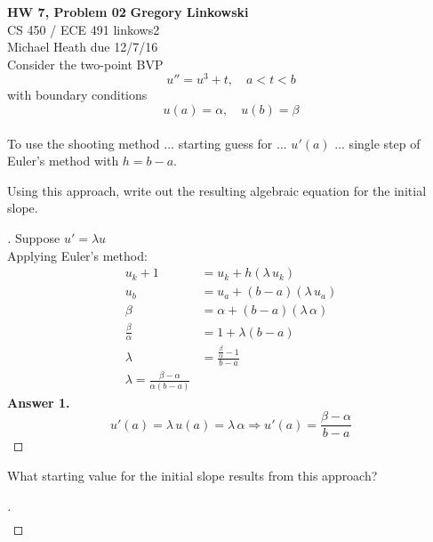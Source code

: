 \documentclass[12pt]{article}
\newenvironment{exercise}[2][Exercise]{\begin{trivlist}
\item[\hskip \labelsep {\bfseries #1}\hskip \labelsep {\bfseries #2.}]}{\end{trivlist}}
\begin{document}
\noindent
\large\textbf{HW 7, Problem 02} \hfill \textbf{Gregory Linkowski} \\
\normalsize CS 450 / ECE 491 \hfill linkows2 \\
Michael Heath \hfill due 12/7/16 \\


\vspace{5mm}
Consider the two-point BVP
\[ u'' = u^3 + t, \quad a < t < b \]
with boundary conditions
\[ u(a) = \alpha, \quad u(b) = \beta \] \\
To use the shooting method ... starting guess for ... $u'(a)$ ... single step of Euler's method with $h = b - a$.
\vspace{-2mm} \\

\vspace{5mm}
\begin{exercise}{1}
	Using this approach, write out the resulting algebraic equation for the initial slope.
\end{exercise} %
\begin{proof}[]
	Suppose $u' = \lambda u$ \\
	Applying Euler's method:
	\begin{align*}
		u_k+1 &= u_k + h(\lambda \, u_k) \\
		u_b &= u_a + (b - a) (\lambda \, u_a) \\
		\beta &= \alpha + (b - a) (\lambda \, \alpha) \\
		\frac{\beta}{\alpha} &= 1 + \lambda (b - a) \\
		\lambda &= \frac{\frac{\beta}{\alpha} - 1}{b - a} \\
		\lambda = \frac{\beta - \alpha}{\alpha (b - a)}
	\end{align*}
	\textbf{Answer 1.} \vspace{-7mm} \\
		\[ u'(a) = \lambda \, u(a) = \lambda \, \alpha \Rightarrow \boxed{ u'(a) = \frac{\beta - \alpha}{b - a} } \]
\end{proof}

\vspace{5mm}
\begin{exercise}{2}
	What starting value for the initial slope results from this approach?
\end{exercise} \vspace{-10mm}
\begin{proof}[]
	\begin{align*}
	\end{align*}
\end{proof}
\end{document}
